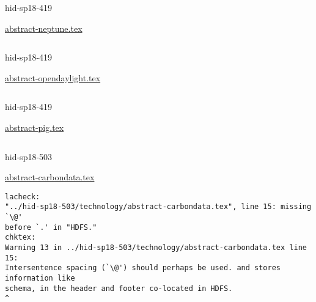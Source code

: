 

\begin{IU}

hid-sp18-419

\href{https://github.com/cloudmesh-community/hid-sp18-419/blob/master//technology/abstract-neptune.tex}{abstract-neptune.tex}

\begin{tiny}
\begin{verbatim}
\end{verbatim}
\end{tiny}
\end{IU}



\begin{IU}

hid-sp18-419

\href{https://github.com/cloudmesh-community/hid-sp18-419/blob/master//technology/abstract-opendaylight.tex}{abstract-opendaylight.tex}

\begin{tiny}
\begin{verbatim}
\end{verbatim}
\end{tiny}
\end{IU}



\begin{IU}

hid-sp18-419

\href{https://github.com/cloudmesh-community/hid-sp18-419/blob/master//technology/abstract-pig.tex}{abstract-pig.tex}

\begin{tiny}
\begin{verbatim}
\end{verbatim}
\end{tiny}
\end{IU}



\begin{IU}

hid-sp18-503

\href{https://github.com/cloudmesh-community/hid-sp18-503/blob/master//technology/abstract-carbondata.tex}{abstract-carbondata.tex}

\begin{tiny}
\begin{verbatim}
lacheck:
"../hid-sp18-503/technology/abstract-carbondata.tex", line 15: missing `\@'
before `.' in "HDFS."
chktex:
Warning 13 in ../hid-sp18-503/technology/abstract-carbondata.tex line 15:
Intersentence spacing (`\@') should perhaps be used. and stores information like
schema, in the header and footer co-located in HDFS.
^
\end{verbatim}
\end{tiny}
\end{IU}

